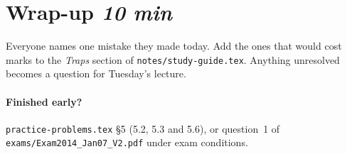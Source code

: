 \documentclass{fkt-notes}
\begin{document}
\section*{Wrap-up \hfill\normalsize\emph{10 min}}
Everyone names one mistake they made today. Add the ones that would cost marks to the \emph{Traps} section of \texttt{notes/study-guide.tex}. Anything unresolved becomes a question for Tuesday's lecture.

\paragraph{Finished early?} \texttt{practice-problems.tex} \S5 (5.2, 5.3 and 5.6), or question~1 of \texttt{exams/Exam2014\_Jan07\_V2.pdf} under exam conditions.
\end{document}
